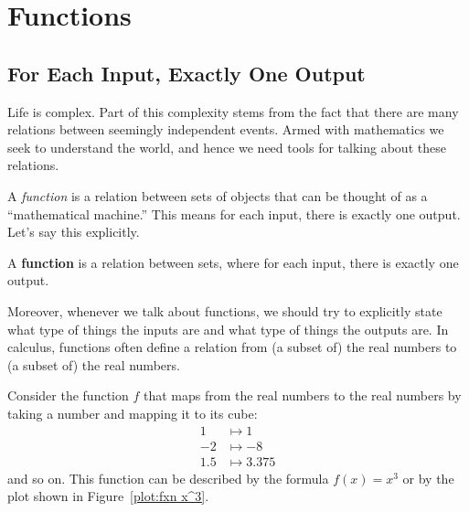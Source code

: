 \chapter{Functions}

\section{For Each Input, Exactly One Output}

Life is complex. Part of this complexity stems from the fact that
there are many relations between seemingly independent events. Armed
with mathematics we seek to understand the world, and hence we need
tools for talking about these relations.


A \textit{function} is a relation between sets of objects that can be
thought of as a ``mathematical machine.'' This means for each input,
there is exactly one output. Let's say this explicitly.

\begin{definition}
A \textbf{function} is a relation between sets, where for each input,
there is exactly one output.
\end{definition}

Moreover, whenever we talk about functions, we should try to
explicitly state what type of things the inputs are and what type of
things the outputs are.  In calculus, functions often define a
relation from (a subset of) the real numbers to (a subset of) the real
numbers.


\begin{example}
Consider the function $f$ that maps from the real numbers to the real
numbers by taking a number and mapping it to its cube:
\begin{align*}
1 &\mapsto 1\\
-2 &\mapsto -8\\
1.5 &\mapsto 3.375
\end{align*}
and so on. This function can be described by the formula $f(x)=x^3$ or
by the plot shown in Figure~\ref{plot:fxn x^3}.
\end{example}

